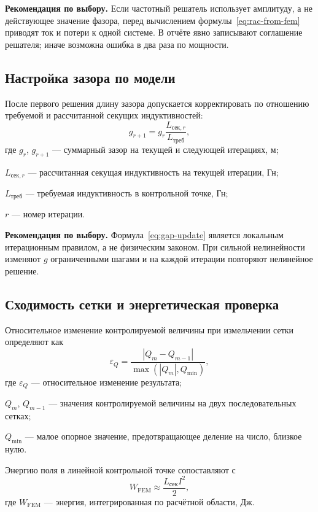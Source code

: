\documentclass[14pt,a4paper]{extarticle}
\newcommand{\recommend}{\par\noindent\textbf{Рекомендация по выбору.} }
\begin{document}
\recommend Если частотный решатель использует амплитуду, а не действующее
значение фазора, перед вычислением формулы~\eqref{eq:rac-from-fem} приводят
ток и потери к одной системе. В отчёте явно записывают соглашение решателя;
иначе возможна ошибка в два раза по мощности.

\subsection{Настройка зазора по модели}

После первого решения длину зазора допускается корректировать по
отношению требуемой и рассчитанной секущих индуктивностей:
\begin{equation}
 g_{r+1}=g_r
 \frac{L_{\text{сек},r}}{L_{\text{треб}}},
 \label{eq:gap-update}
\end{equation}
где $g_r$, $g_{r+1}$ --- суммарный зазор на текущей и следующей
итерациях, м;\par\noindent
$L_{\text{сек},r}$ --- рассчитанная секущая индуктивность на текущей
итерации, Гн;\par\noindent
$L_{\text{треб}}$ --- требуемая индуктивность в контрольной точке, Гн;\par\noindent
$r$ --- номер итерации.

\recommend Формула~\eqref{eq:gap-update} является локальным
итерационным правилом, а не физическим законом. При сильной
нелинейности изменяют $g$ ограниченными шагами и на каждой итерации
повторяют нелинейное решение.

\subsection{Сходимость сетки и энергетическая проверка}

Относительное изменение контролируемой величины при измельчении сетки
определяют как
\begin{equation}
 \varepsilon_Q=
 \frac{\left|Q_m-Q_{m-1}\right|}
 {\max\!\left(\left|Q_m\right|,Q_{\min}\right)},
 \label{eq:mesh-convergence}
\end{equation}
где $\varepsilon_Q$ --- относительное изменение результата;\par\noindent
$Q_m$, $Q_{m-1}$ --- значения контролируемой величины на двух
последовательных сетках;\par\noindent
$Q_{\min}$ --- малое опорное значение, предотвращающее деление на
число, близкое нулю.

Энергию поля в линейной контрольной точке сопоставляют с
\begin{equation}
 W_{\text{FEM}}\approx\frac{L_{\text{сек}}I^2}{2},
 \label{eq:fem-energy-check}
\end{equation}
где $W_{\text{FEM}}$ --- энергия, интегрированная по расчётной области,
Дж.
\end{document}
